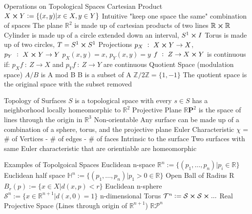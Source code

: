 \documentclass[14pt]{extarticle}
\begin{document}
\begin{outline}
		\1	Operations on Topological Spaces
			\2	Cartesian Product
				\3	$X \cross Y := \{(x,y) | x \in X, y \in Y\}$
				\3	Intuitive "keep one space the same" combination of spaces
				\3	The plane $\mathbb{R}^2$ is made up of cartesian products of two lines $\mathbb{R} \cross \mathbb{R}$
				\3	Cylinder is made up of a circle extended down an interval, $S^1 \cross I$
				\3	Torus is made up of two circles, $T = S^1 \cross S^1$
			\2	Projections
				\3	$p_X~:~X \cross Y \rightarrow X$, $p_Y~:~X\cross Y \rightarrow Y$
				\3	$p_X(x,y) = x$, $p_Y(x,y) = y$
				\3	$f~:~Z \rightarrow X \cross Y$ is continuous if:
					\4	$p_Xf~:~Z\rightarrow X$ and $p_Yf~:~Z\rightarrow Y$ are continuous		
			\2	Quotient Space (modulation space)
				\3	$A / B$ is A mod B
				\3	B is a subset of A
				\3	$\mathbb{Z} / 2\mathbb{Z} = \{1,-1\}$ 
				\3	The quotient space is the original space with the subset removed
				
		\1	Topology of Surfaces
			\2	$S$ is a topological space with every $s \in S$ has a neighborhood locally homeomorphic to $\mathbb{R}^2$
			\2	Projective Plane
				\3	$\mathbb{R}\bm{P}^2$ is the space of lines through the origin in $\mathbb{R}^3$
				\3	Non-orientable
			\2	Any surface can be made up of a combination of a sphere, torus, and the projective plane
			\2	Euler Characteristic $\chi$ = \# of Vertices - \# of edges - \# of faces
				\3	Intrinsic to the surface
				\3	Two surfaces with same Euler characteristic that are orientiable are homeomorphic
		
		\1	Examples of Topolgoical Spaces
			\2	Euclidean n-space $\mathbb{R}^n := \{(p_1,...,p_n) | p_i \in \mathbb{R}\}$
			\2	Euclidean half space $\mathbb{H}^n := \{(p_1,...,p_n) | p_1 > 0 \in \mathbb{R}\}$
			\2	Open Ball of Radius R $B_r(p) := \{x \in X | d(x,p) < r\}$
			\2	Euclidean n-sphere $\mathcal{S}^n := \{x \in \mathbb{R}^{n+1} | d(x,0) = 1\}$
			\2	n-dimensional Torus $\mathcal{T}^n := \mathcal{S} \cross \mathcal{S} \cross ...$
			\2	Real Projective Space (Lines through origin of $\mathbb{R}^{n+1}$) $\mathbb{R}\mathcal{P}^n$

	\end{outline}
\end{document}
